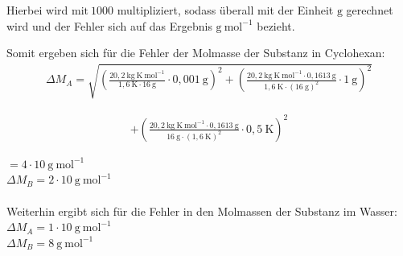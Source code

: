 \documentclass[12pt,a4paper,titlepage,headinclude,bibtotoc]{scrartcl}
\begin{document}
Hierbei wird $\mathrm{mit {~}1000}$ multipliziert, sodass überall mit der Einheit $\mathrm{g}$ gerechnet wird und der Fehler sich auf das Ergebnis $\mathrm{g{~} mol^{-1}}$ bezieht.

Somit ergeben sich für die Fehler der Molmasse der Substanz in Cyclohexan:\\

\begin{align}
\Delta M_A = \sqrt{ \left( \frac {20,2 {~}\mathrm{kg {~} K {~} mol^{-1}}}{ 1,6 {~} \mathrm{K} \cdot 16 {~}\mathrm{g}} \cdot 0,001 {~}\mathrm{g} \right)^2 + \left( \frac { 20,2 {~}\mathrm{kg{~}K {~} mol^{-1}} \cdot 0,1613{~}\mathrm{g} }{ 1,6 {~}\text{K}\cdot (16 {~}\mathrm{g} )^2 } \cdot 1 {~} \mathrm{g} \right)^2}  
\end{align}

\begin{align}
+  \left( \frac {20,2 {~}\mathrm{kg{~}K {~} mol^{-1}} \cdot 0,1613 {~} \mathrm{g}} { 16 {~} \mathrm{g} \cdot (1,6 {~} \text{K})^2} \cdot 0,5{~} \text{K} \right)^2 
\end{align}

$ = 4 \cdot 10{~}\mathrm{g{~}mol^{-1}} $\\
$\Delta M_B = 2 \cdot 10 {~}\mathrm{g{~}mol^{-1}}$\\\\

Weiterhin ergibt sich für die Fehler in den Molmassen der Substanz im Wasser:\\
$\Delta M_A = 1 \cdot 10 {~}\mathrm{g{~}mol^{-1}} $\\
$\Delta M_B = 8 {~}\mathrm{g{~}mol^{-1}}$\\
\end{document}
